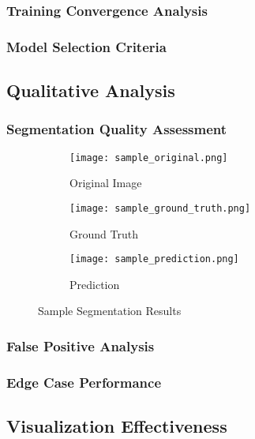 \documentclass[12pt,a4paper]{report}
\begin{document}
\subsubsection{Training Convergence Analysis}

\subsubsection{Model Selection Criteria}

\subsection{Qualitative Analysis}

\subsubsection{Segmentation Quality Assessment}

\begin{figure}[H]
\centering
\begin{subfigure}{0.3\textwidth}
    \texttt{[image: sample\_original.png]}
    \caption{Original Image}
\end{subfigure}
\begin{subfigure}{0.3\textwidth}
    \texttt{[image: sample\_ground\_truth.png]}
    \caption{Ground Truth}
\end{subfigure}
\begin{subfigure}{0.3\textwidth}
    \texttt{[image: sample\_prediction.png]}
    \caption{Prediction}
\end{subfigure}
\caption{Sample Segmentation Results}
\label{fig:sample_results}
\end{figure}

\subsubsection{False Positive Analysis}

\subsubsection{Edge Case Performance}

\subsection{Visualization Effectiveness}
\end{document}
